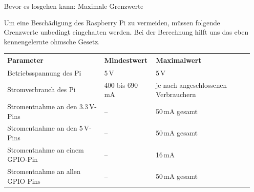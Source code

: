 {
\small

\begin{frame}{Bevor es losgehen kann: Maximale Grenzwerte}
    \parbox{\linewidth}{
        Um eine Beschädigung des Raspberry Pi zu vermeiden, müssen folgende Grenzwerte unbedingt
        eingehalten werden. Bei der Berechnung hilft uns das eben kennengelernte ohmsche Gesetz.
    }

    \bigskip

    \begin{tabularx}{\textwidth}{|X|X|X|}
        \hline
        \textbf{Parameter} & \textbf{Mindestwert} & \textbf{Maximalwert} \\
        \hline

        Betriebsspannung des Pi & 5\,V & 5\,V \\
        \hline

        Stromverbrauch des Pi & 400 bis 690\,mA & je nach angeschlossenen Verbrauchern \\
        \hline

        Stromentnahme an den 3.3\,V-Pins & -- & 50\,mA gesamt \\
        \hline

        Stromentnahme an den 5\,V-Pins & -- & 50\,mA gesamt \\
        \hline

        Stromentnahme an einem GPIO-Pin & -- & 16\,mA \\
        \hline

        Stromentnahme an allen GPIO-Pins & -- & 50\,mA gesamt \\
        \hline
    \end{tabularx}
\end{frame}
}

